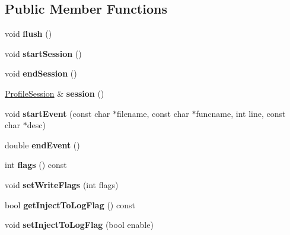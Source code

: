 \subsection*{Public Member Functions}
\begin{DoxyCompactItemize}
\item 
\hypertarget{classps_1_1utils_1_1Profiler_ae8755d1de94204b42123c093884feccf}{}void {\bfseries flush} ()\label{classps_1_1utils_1_1Profiler_ae8755d1de94204b42123c093884feccf}

\item 
\hypertarget{classps_1_1utils_1_1Profiler_ab018e18a3e870379f3a04791c90c850e}{}void {\bfseries start\+Session} ()\label{classps_1_1utils_1_1Profiler_ab018e18a3e870379f3a04791c90c850e}

\item 
\hypertarget{classps_1_1utils_1_1Profiler_a34f00163bb62d1085e18f5f4562bcd47}{}void {\bfseries end\+Session} ()\label{classps_1_1utils_1_1Profiler_a34f00163bb62d1085e18f5f4562bcd47}

\item 
\hypertarget{classps_1_1utils_1_1Profiler_ad5c467c6266fdab116b9568923fefac8}{}\hyperlink{classps_1_1utils_1_1ProfileSession}{Profile\+Session} \& {\bfseries session} ()\label{classps_1_1utils_1_1Profiler_ad5c467c6266fdab116b9568923fefac8}

\item 
\hypertarget{classps_1_1utils_1_1Profiler_ad3520861e4d1462e422878c6c9edf159}{}void {\bfseries start\+Event} (const char $\ast$filename, const char $\ast$funcname, int line, const char $\ast$desc)\label{classps_1_1utils_1_1Profiler_ad3520861e4d1462e422878c6c9edf159}

\item 
\hypertarget{classps_1_1utils_1_1Profiler_ae5df55613c62a0522f771b2661aedb54}{}double {\bfseries end\+Event} ()\label{classps_1_1utils_1_1Profiler_ae5df55613c62a0522f771b2661aedb54}

\item 
\hypertarget{classps_1_1utils_1_1Profiler_a270ef0d1a6e125f7b7e316508d1e6f4c}{}int {\bfseries flags} () const \label{classps_1_1utils_1_1Profiler_a270ef0d1a6e125f7b7e316508d1e6f4c}

\item 
\hypertarget{classps_1_1utils_1_1Profiler_ab459057072839f004800d7e585a0e98f}{}void {\bfseries set\+Write\+Flags} (int flags)\label{classps_1_1utils_1_1Profiler_ab459057072839f004800d7e585a0e98f}

\item 
\hypertarget{classps_1_1utils_1_1Profiler_a5cdffd3ce406cbf1655febc09a972762}{}bool {\bfseries get\+Inject\+To\+Log\+Flag} () const \label{classps_1_1utils_1_1Profiler_a5cdffd3ce406cbf1655febc09a972762}

\item 
\hypertarget{classps_1_1utils_1_1Profiler_acbeb306ceb667e5d5b8e13385cf3ddc6}{}void {\bfseries set\+Inject\+To\+Log\+Flag} (bool enable)\label{classps_1_1utils_1_1Profiler_acbeb306ceb667e5d5b8e13385cf3ddc6}

\end{DoxyCompactItemize}
